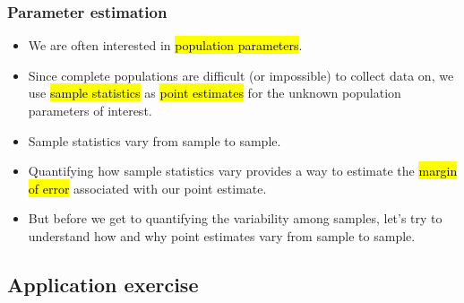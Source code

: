 \begin{frame}
\frametitle{Parameter estimation}

\begin{itemize}

\item We are often interested in \hl{population parameters}.

\item Since complete populations are difficult (or impossible) to collect data on, we use \hl{sample statistics} as \hl{point estimates} for the unknown population parameters of interest.

\item Sample statistics vary from sample to sample.

\item Quantifying how sample statistics vary provides a way to estimate the \hl{margin of error} associated with our point estimate.

\item But before we get to quantifying the variability among samples, let's try to understand how and why point estimates vary from sample to sample.

\end{itemize}


\pause


\end{frame}


\subsection{Application exercise}


